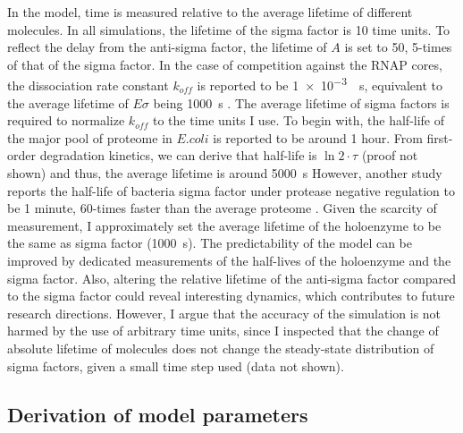 In the model, time is measured relative to the average lifetime of
different molecules.
In all simulations, the lifetime of the sigma factor is 10 time units.
To reflect the delay from the anti-sigma factor, the lifetime of
$A$ is set to 50, 5-times of that of the sigma factor.
In the case of competition against the RNAP cores,
the dissociation rate constant $k_{off}$ is reported to be 
\SI{1e-3}{\per\second}, equivalent to the average lifetime
of $E\sigma$ being \SI{1000}{\second} \cite{mauri14}.
The average lifetime of sigma factors is required to normalize
$k_{off}$ to the time units I use.
To begin with, the half-life of the major pool of proteome in $E. coli$ 
is reported to be around 1 hour.
From first-order degradation kinetics, we can derive that half-life
is $\ln 2 \cdot \tau$ (proof not shown) and thus,
the average lifetime is around \SI{5000}{\second} \cite{maurizi92}
However, another study reports the half-life of bacteria sigma factor
under protease negative regulation to be 1 minute, 60-times faster than
the average proteome \cite{el-samad05}.
Given the scarcity of measurement, I approximately set the average lifetime
of the holoenzyme to be the same as sigma factor (\SI{1000}{\second}).
The predictability of the model can be improved by dedicated measurements
of the half-lives of the holoenzyme and the sigma factor.
Also, altering the relative lifetime of the anti-sigma factor compared
to the sigma factor could reveal interesting dynamics,
which contributes to future research directions.
However, I argue that the accuracy of the simulation is not harmed
by the use of arbitrary time units, since I inspected that
the change of absolute lifetime of molecules does not change the 
steady-state distribution of sigma factors, given a small
time step used (data not shown).

\subsection{Derivation of model parameters}
\label{sec:discussion_parameters}

